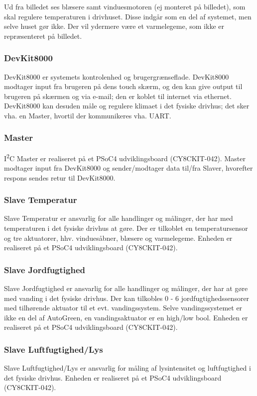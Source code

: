 Ud fra billedet ses blæsere samt vinduesmotoren (ej monteret på billedet), som skal regulere temperaturen i drivhuset. Disse indgår som en del af systemet, men selve huset gør ikke. Der vil ydermere være et varmelegeme, som ikke er repræsenteret på billedet. 

\subsubsection{DevKit8000}
DevKit8000 er systemets kontrolenhed og brugergrænseflade. 
DevKit8000 modtager input fra brugeren på dens touch skærm, og den kan give output til brugeren på skærmen og via e-mail; den er koblet til internet via ethernet. 
DevKit8000 kan desuden måle og regulere klimaet i det fysiske drivhus; det sker vha. en \IIC Master, hvortil der kommunikeres vha. UART.
\subsubsection{\IIC Master}
I\textsuperscript{2}C Master er realiseret på et PSoC4 udviklingsboard (CY8CKIT-042). 
\IIC Master modtager input fra DevKit8000 og sender/modtager data til/fra \IIC Slaver, hvorefter respons sendes retur til DevKit8000.	
\subsubsection{\IIC Slave Temperatur}
\IIC Slave Temperatur er ansvarlig for alle handlinger og målinger, der har med temperaturen i det fysiske drivhus at gøre. Der er tilkoblet en temperatursensor og tre aktuatorer, hhv. vinduesåbner, blæsere og varmelegeme. 
Enheden er realiseret på et PSoC4 udviklingsboard (CY8CKIT-042).
\subsubsection{\IIC Slave Jordfugtighed}
\IIC Slave Jordfugtighed er ansvarlig for alle handlinger og målinger, der har at gøre med vanding i det fysiske drivhus. Der kan tilkobles 0 - 6 jordfugtighedssensorer med tilhørende aktuator til et evt. vandingssystem. Selve vandingssystemet er ikke en del af AutoGreen, en vandingsaktuator er en high/low bool. Enheden er realiseret på et PSoC4 udviklingsboard (CY8CKIT-042).
\subsubsection{\IIC Slave Luftfugtighed/Lys}
\IIC Slave Luftfugtighed/Lys er ansvarlig for måling af lysintensitet og luftfugtighed i det fysiske drivhus. Enheden er realiseret på et PSoC4 udviklingsboard (CY8CKIT-042).

